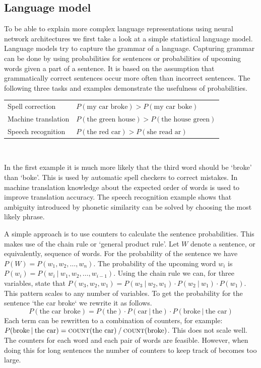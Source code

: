 \subsection{Language model}
\label{subsec:language_model}
To be able to explain more complex language representations using neural network architectures we first take a look at a simple statistical language model.
Language models try to capture the grammar of a language.
Capturing grammar can be done by using probabilities for sentences or probabilities of upcoming words given a part of a sentence.
It is based on the assumption that grammatically correct sentences occur more often than incorrect sentences.
The following three tasks and examples demonstrate the usefulness of probabilities.
\begin{center}
    \begin{tabular}{l l}
        Spell correction & $P(\text{my car broke}) > P(\text{my car boke})$\\
        Machine translation & $P(\text{the green house}) > P(\text{the house green})$\\
        Speech recognition & $P(\text{the red car}) > P(\text{she read ar})$
    \end{tabular}\\
\end{center}
In the first example it is much more likely that the third word should be `broke' than `boke'.
This is used by automatic spell checkers to correct mistakes.
In machine translation knowledge about the expected order of words is used to improve translation accuracy.
The speech recognition example shows that ambiguity introduced by phonetic similarity can be solved by choosing the most likely phrase.

A simple approach is to use counters to calculate the sentence probabilities.
This makes use of the chain rule or `general product rule'.
Let $W$ denote a sentence, or equivalently, sequence of words.
For the probability of the sentence we have $P(W) = P(w_1, w_2, \ldots, w_n)$.
The probability of the upcoming word $w_i$ is $P(w_i) = P(w_i \: | \: w_1, w_2, \ldots, w_{i-1})$.
Using the chain rule we can, for three variables, state that $P(w_3, w_2, w_1) = P(w_3 \: | \: w_2, w_1) \cdot P(w_2 \: | \: w_1) \cdot P(w_1)$.
This pattern scales to any number of variables.
To get the probability for the sentence `the car broke` we rewrite it as follows.
\[ P(\text{the car broke}) = P(\text{the}) \cdot P(\text{car} \: | \: \text{the}) \cdot P(\text{broke} \: | \: \text{the car}) \]
Each term can be rewritten to a combination of counters, for example: $P(\text{broke} \: | \: \text{the car}) = \textsc{count}(\text{the car}) \: / \: \textsc{count}(\text{broke})$.
This does not scale well.
The counters for each word and each pair of words are feasible.
However, when doing this for long sentences the number of counters to keep track of becomes too large.

